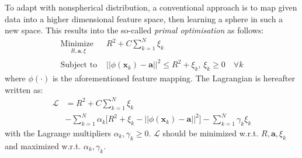 \documentclass[conference]{IEEEtran}
\theoremstyle{problemstyle}
\begin{document}
To adapt with nonspherical distribution, a conventional approach is to map given data into a higher dimensional feature space, then learning a sphere in such a new space. This results into the so-called \emph{primal optimisation} as follows:
\begin{subequations}\label{eq:svm_primal}
\begin{align}
\underset{
	\begin{array}{c}
		 R, \mathbf{a}, \xi
	\end{array}}{\text{Minimize }} &R^2 + C \sum_{k=1}^N \xi_k \\
\text{Subject to } &\left|\left| \phi \left( \mathbf{x}_k \right) - \mathbf{a}  \right|\right|^2 \le R^2 + \xi_k \text{, } \xi_k \ge 0 \quad \forall k
\end{align}
\end{subequations}
where $\phi \left( \cdot \right)$ is the aforementioned feature mapping. The Lagrangian is hereafter written as:
\begin{align}
\mathcal{L} &= R^2 + C \sum_{k=1}^N \xi_k \nonumber \\&- \sum_{k=1}^N \alpha_k \bigg[ R^2 + \xi_k - \left|\left| \phi \left( \mathbf{x}_k \right) - \mathbf{a} \right|\right|^2 \bigg] - \sum_{k=1}^N \gamma_k \xi_k \label{eq:svm_lagrange_init}
\end{align}
with the Lagrange multipliers $\alpha_k, \gamma_k \ge 0$. $\mathcal{L}$ should be minimized w.r.t. $R, \mathbf{a}, \xi_k$ and maximized w.r.t. $\alpha_k, \gamma_k$.
\end{document}
